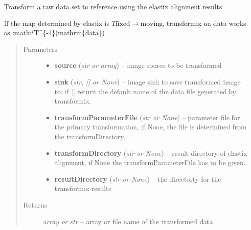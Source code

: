 \documentclass[letterpaper,10pt,english]{sphinxmanual}
\begin{document}
\begin{fulllineitems}
\label{api/ClearMap.Alignment:ClearMap.Alignment.Elastix.transformData}
Transform a raw data set to reference using the elastix alignment results

If the map determined by elastix is
\(T \mathrm{fixed} \rightarrow \mathrm{moving}\),
transformix on data works as :math:{\color{red}\bfseries{}{}`}T\textasciicircum{}\{-1\}(mathrm\{data\})
\begin{quote}\begin{description}
\item[{Parameters}] \leavevmode\begin{itemize}
\item {} 
\textbf{source} (\emph{str or array}) --
image source to be transformed

\item {} 
\textbf{sink} (\emph{str, {[}{]} or None}) --
image sink to save transformed image to. if {[}{]} return the default name of the data file generated by transformix.

\item {} 
\textbf{transformParameterFile} (\emph{str or None}) --
parameter file for the primary transformation, if None, the file is determined from the transformDirectory.

\item {} 
\textbf{transformDirectory} (\emph{str or None}) --
result directory of elastix alignment, if None the transformParameterFile has to be given.

\item {} 
\textbf{resultDirectory} (\emph{str or None}) --
the directorty for the transformix results

\end{itemize}

\item[{Returns}] \leavevmode
\emph{array or str} --
array or file name of the transformed data

\end{description}\end{quote}

\end{fulllineitems}

\end{document}
